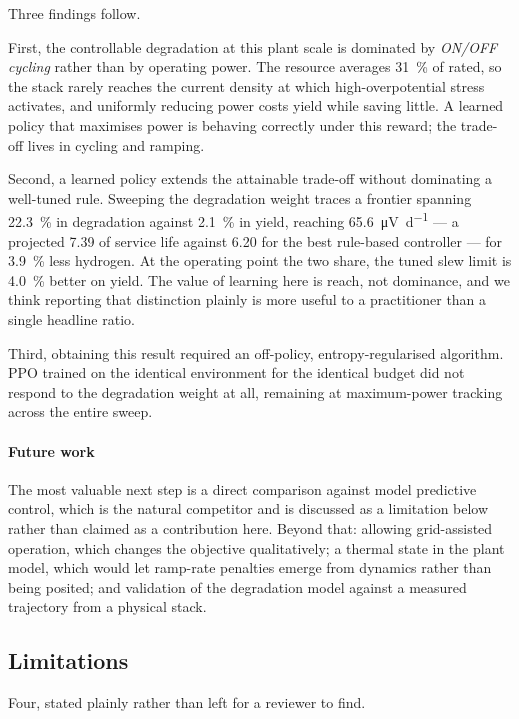 \documentclass[conference]{IEEEtran}
\begin{document}
Three findings follow.

First, the controllable degradation at this plant scale is dominated by \emph{ON/OFF
cycling} rather than by operating power. The resource averages \SI{31}{\percent} of rated,
so the stack rarely reaches the current density at which high-overpotential stress
activates, and uniformly reducing power costs yield while saving little. A learned policy
that maximises power is behaving correctly under this reward; the trade-off lives in
cycling and ramping.

Second, a learned policy extends the attainable trade-off without dominating a well-tuned
rule. Sweeping the degradation weight traces a frontier spanning \SI{22.3}{\percent} in
degradation against \SI{2.1}{\percent} in yield, reaching \SI{65.6}{\micro\volt\per\day}
--- a projected \SI{7.39}{\year} of service life against \SI{6.20}{\year} for the best
rule-based controller --- for \SI{3.9}{\percent} less hydrogen. At the operating point the
two share, the tuned slew limit is \SI{4.0}{\percent} better on yield. The value of
learning here is reach, not dominance, and we think reporting that distinction plainly is
more useful to a practitioner than a single headline ratio.

Third, obtaining this result required an off-policy, entropy-regularised algorithm. PPO
trained on the identical environment for the identical budget did not respond to the
degradation weight at all, remaining at maximum-power tracking across the entire sweep.

\paragraph{Future work}
The most valuable next step is a direct comparison against model predictive control, which
is the natural competitor and is discussed as a limitation below rather than claimed as a
contribution here. Beyond that: allowing grid-assisted operation, which changes the
objective qualitatively; a thermal state in the plant model, which would let ramp-rate
penalties emerge from dynamics rather than being posited; and validation of the degradation
model against a measured trajectory from a physical stack.

\subsection*{Limitations}\label{sec:limitations}
Four, stated plainly rather than left for a reviewer to find.
\end{document}
